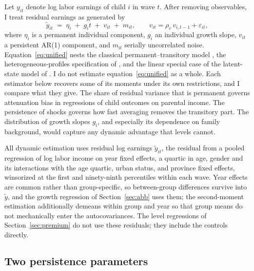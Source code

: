 \documentclass[11pt]{article}
\begin{document}
Let $y_{it}$ denote log labor earnings of child $i$ in wave $t$. After
removing observables, I treat residual earnings as generated by
\begin{equation}
\tilde y_{it} \;=\; \eta_i \;+\; g_i t \;+\; v_{it} \;+\; m_{it},
\qquad v_{it} = \rho_v\,v_{i,t-1} + \varepsilon_{it},
\label{eq:unified}
\end{equation}
where $\eta_i$ is a permanent individual component, $g_i$ an
individual growth slope, $v_{it}$ a persistent AR(1) component, and
$m_{it}$ serially uncorrelated noise. Equation~\eqref{eq:unified} nests
the classical permanent--transitory model \citep{HallMishkin1982,
MaCurdy1982}, the heterogeneous-profiles specification of
\citet{Guvenen2009}, and the linear special case of the latent-state
model of \citet{ArellanoBlundellBonhomme2017}. I do not estimate
equation~\eqref{eq:unified} as a whole. Each estimator below recovers
some of its moments under its own restrictions, and I compare what they
give. The share of residual variance that is permanent governs
attenuation bias in regressions of child outcomes on parental income. The persistence of shocks
governs how fast averaging removes the transitory part. The
distribution of growth slopes $g_i$, and especially its dependence
on family background, would capture any dynamic advantage that levels
cannot.

All dynamic estimation uses residual log earnings $\tilde y_{it}$, the
residual from a pooled regression of log labor income on year fixed
effects, a quartic in age, gender and its interactions with the age
quartic, urban status, and province fixed effects, winsorized at the
first and ninety-ninth percentiles within each wave. Year effects are
common rather than group-specific, so between-group differences survive
into $\tilde y$, and the growth regression of Section~\ref{sec:abb} uses
them; the second-moment estimation additionally demeans within group and year so
that group means do not mechanically enter the autocovariances. The
level regressions of Section~\ref{sec:premium} do not use these
residuals; they include the controls directly.

\subsection{Two persistence parameters}
\label{sec:twopers}
\end{document}
